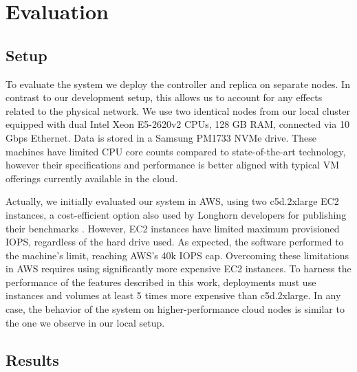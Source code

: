 


\section{Evaluation}

\subsection{Setup}

To evaluate the system we deploy the controller and replica on separate nodes. In contrast to our development setup, this allows us to account for any effects related to the physical network. We use two identical nodes from our local cluster equipped with dual Intel Xeon E5-2620v2 CPUs, 128 GB RAM, connected via 10 Gbps Ethernet. Data is stored in a Samsung PM1733 NVMe drive. These machines have limited CPU core counts compared to state-of-the-art technology, however their specifications and performance is better aligned with typical VM offerings currently available in the cloud.

Actually, we initially evaluated our system in AWS, using two c5d.2xlarge EC2 instances, a cost-efficient option also used by Longhorn developers for publishing their benchmarks \cite{longhorn_report}.
However, EC2 instances have limited maximum provisioned IOPS, regardless of the hard drive used. As expected, the software performed to the machine's limit, reaching AWS's 40k IOPS cap. Overcoming these limitations in AWS requires using significantly more expensive EC2 instances. To harness the performance of the features described in this work, deployments must use instances and volumes at least 5 times more expensive than c5d.2xlarge. In any case, the behavior of the system on higher-performance cloud nodes is similar to the one we observe in our local setup.

\subsection{Results}


